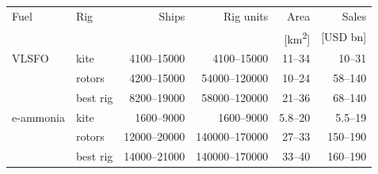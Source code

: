 \begin{tabular}{@{}llrrrr@{}}
\toprule
Fuel & Rig & Ships & Rig units & Area & Sales \\
 &  &  &  & [km\textsuperscript{2}] & [USD bn] \\
\midrule
VLSFO & kite & \num{4100}--\num{15000} & \num{4100}--\num{15000} & \num{11}--\num{34} & \num{10}--\num{31} \\
 & rotors & \num{4200}--\num{15000} & \num{54000}--\num{120000} & \num{10}--\num{24} & \num{58}--\num{140} \\
 & best rig & \num{8200}--\num{19000} & \num{58000}--\num{120000} & \num{21}--\num{36} & \num{68}--\num{140} \\
\midrule
e-ammonia & kite & \num{1600}--\num{9000} & \num{1600}--\num{9000} & \num{5.8}--\num{20} & \num{5.5}--\num{19} \\
 & rotors & \num{12000}--\num{20000} & \num{140000}--\num{170000} & \num{27}--\num{33} & \num{150}--\num{190} \\
 & best rig & \num{14000}--\num{21000} & \num{140000}--\num{170000} & \num{33}--\num{40} & \num{160}--\num{190} \\
\bottomrule
\end{tabular}
